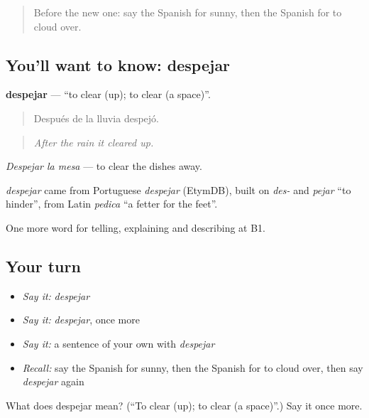 \label{lesson:ES-C698-despejar}



\begin{quote}
Before the new one: say the Spanish for sunny, then the Spanish for to cloud over.
\end{quote}

\subsection*{You'll want to know: despejar}
\textbf{despejar} — \textquotedblleft{}to clear (up); to clear (a space)\textquotedblright{}.

\begin{quote}
Después de la lluvia despejó.
\end{quote}

\begin{quote}
\emph{After the rain it cleared up.}
\end{quote}

\emph{Despejar la mesa} — to clear the dishes away.

\begin{cousinweb}
\emph{despejar} came from Portuguese \emph{despejar} (EtymDB), built on \emph{des-} and \emph{pejar} \textquotedblleft{}to hinder\textquotedblright{}, from Latin \emph{pedica} \textquotedblleft{}a fetter for the feet\textquotedblright{}.
\end{cousinweb}

\begin{grammarlens}[title={What you've built}]
One more word for telling, explaining and describing at B1.
\end{grammarlens}

\subsection*{Your turn}
\begin{itemize}
\raggedright
  \item \emph{Say it:} \emph{despejar}
  \item \emph{Say it:} \emph{despejar}, once more
  \item \emph{Say it:} a sentence of your own with \emph{despejar}
  \item \emph{Recall:} say the Spanish for sunny, then the Spanish for to cloud over, then say \emph{despejar} again
\end{itemize}

\begin{tcolorbox}[breakable,colback=teal!4,colframe=teal!35!black,title={Before you move on}]
What does despejar mean? (\textquotedblleft{}To clear (up); to clear (a space)\textquotedblright{}.) Say it once more.
\end{tcolorbox}
